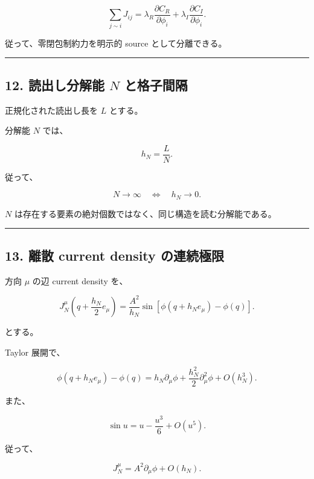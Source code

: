 \documentclass[
  a4paper,
]{ltjsarticle}
\begin{document}
\[
\sum_{j\sim i}J_{ij}
=
\lambda_R
\frac{\partial C_R}{\partial\phi_i}
+
\lambda_I
\frac{\partial C_I}{\partial\phi_i}.
\tag{40}
\]

従って、零閉包制約力を明示的 source として分離できる。

\begin{center}\rule{0.5\linewidth}{0.5pt}\end{center}

\subsection{\texorpdfstring{12. 読出し分解能 \(N\)
と格子間隔}{12. 読出し分解能 N と格子間隔}}\label{ux8aadux51faux3057ux5206ux89e3ux80fd-n-ux3068ux683cux5b50ux9593ux9694}

正規化された読出し長を \(L\) とする。

分解能 \(N\) では、

\[
\boxed{
h_N=\frac{L}{N}.
}
\tag{41}
\]

従って、

\[
\boxed{
N\to\infty
\quad\Longleftrightarrow\quad
h_N\to0.
}
\tag{42}
\]

\(N\) は存在する要素の絶対個数ではなく、同じ構造を読む分解能である。

\begin{center}\rule{0.5\linewidth}{0.5pt}\end{center}

\subsection{13. 離散 current density
の連続極限}\label{ux96e2ux6563-current-density-ux306eux9023ux7d9aux6975ux9650}

方向 \(\mu\) の辺 current density を、

\[
\boxed{
J_N^\mu
\left(
q+\frac{h_N}{2}e_\mu
\right)
=
\frac{A^2}{h_N}
\sin
\left[
\phi(q+h_Ne_\mu)-\phi(q)
\right].
}
\tag{43}
\]

とする。

Taylor 展開で、

\[
\phi(q+h_Ne_\mu)
-
\phi(q)
=
h_N\partial_\mu\phi
+
\frac{h_N^2}{2}
\partial_\mu^2\phi
+
O(h_N^3).
\tag{44}
\]

また、

\[
\sin u
=
u
-
\frac{u^3}{6}
+
O(u^5).
\tag{45}
\]

従って、

\[
J_N^\mu
=
A^2\partial_\mu\phi
+
O(h_N).
\tag{46}
\]
\end{document}
